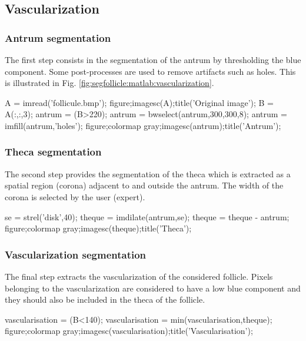 \def\QRCODE{TB_image_TUT.IMG.image_segmentation_follicule_matlabqrcode.png}
\def\QRPAGE{http://www.iptutorials.science/tree/master/TB_image/TUT.IMG.image_segmentation_follicule/matlab}

\subsection{Vascularization}
\subsubsection{Antrum segmentation}
The first step consists in the segmentation of the antrum by thresholding the blue component. Some post-processes are used to remove artifacts such as holes. This is illustrated in Fig. \ref{fig:segfollicle:matlab:vascularization}.


\begin{matlab}
A = imread('follicule.bmp');
figure;imagesc(A);title('Original image');
B = A(:,:,3);
antrum = (B>220);
antrum = bwselect(antrum,300,300,8);
antrum = imfill(antrum,'holes');
figure;colormap gray;imagesc(antrum);title('Antrum');
\end{matlab}


\subsubsection{Theca segmentation}
The second step provides the segmentation of the theca which is extracted as a spatial region (corona) adjacent to and outside the antrum. The width of the corona is selected by the user (expert).
\begin{matlab}
se = strel('disk',40);
theque = imdilate(antrum,se);
theque = theque - antrum;
figure;colormap gray;imagesc(theque);title('Theca');
\end{matlab}

\subsubsection{Vascularization segmentation}
The final step extracts the vascularization of the considered follicle. Pixels belonging to the vascularization are considered to have a low blue component and they should also be included in the theca of the follicle.
\begin{matlab}
vascularisation = (B<140);
vascularisation = min(vascularisation,theque);
figure;colormap gray;imagesc(vascularisation);title('Vascularisation');
\end{matlab}

